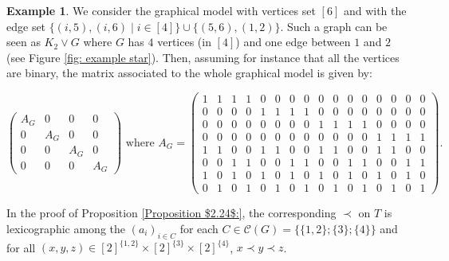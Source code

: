 \documentclass[11pt]{amsart}
\numberwithin{equation}{section}
\theoremstyle{plain}
\numberwithin{theorem}{section}
\theoremstyle{definition}
\newtheorem{example}[theorem]{Example}
\begin{document}
\begin{example}\label{Example $2.25$}
We consider the graphical model with vertices  set $[6]$ and with the edge set $\{(i,5),(i,6)\mid i\in[4]\}\cup\{(5,6),(1,2)\}$. Such a graph can be seen as $K_2\vee G$ where $G$ has $4$ vertices (in $[4]$) and one edge between $1$ and $2$ (see Figure \ref{fig: example star}). Then, assuming for instance that all the vertices are binary, the matrix associated to the whole graphical model is given by:

$$\left(\begin{matrix}
    A_G & 0 & 0 & 0\\
    0&A_G&0&0\\
    0&0&A_G&0\\
    0&0&0&A_G
\end{matrix}\right)\text{ where }A_G=\left(\begin{smallmatrix}
    1&1&1&1&0&0&0&0&0&0&0&0&0&0&0&0\\
    0&0&0&0&1&1&1&1&0&0&0&0&0&0&0&0\\
    0&0&0&0&0&0&0&0&1&1&1&1&0&0&0&0\\
    0&0&0&0&0&0&0&0&0&0&0&0&1&1&1&1\\
    1&1&0&0&1&1&0&0&1&1&0&0&1&1&0&0\\
    0&0&1&1&0&0&1&1&0&0&1&1&0&0&1&1\\
    1&0&1&0&1&0&1&0&1&0&1&0&1&0&1&0\\
    0&1&0&1&0&1&0&1&0&1&0&1&0&1&0&1
\end{smallmatrix}\right).$$

In the proof of Proposition \ref{Proposition $2.24$:}, the corresponding $\prec$ on $T$ is lexicographic among the $(a_i)_{i\in C}$ for each $C\in\mathcal C(G)=\{\{1,2\};\{3\};\{4\}\}$ and for all $(x,y,z)\in[2]^{\{1,2\}}\times[2]^{\{3\}}\times[2]^{\{4\}}$, $x\prec y\prec z$.


\end{example}
\end{document}
